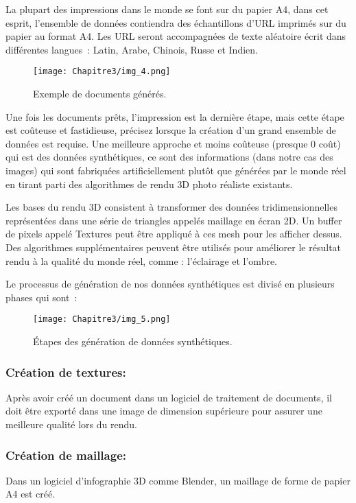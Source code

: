           La plupart des impressions dans le monde se font sur du papier A4, dans cet esprit, l'ensemble de données contiendra des échantillons d'URL imprimés sur du papier au format A4. Les URL seront accompagnées de texte aléatoire écrit dans différentes langues : Latin, Arabe, Chinois, Russe et Indien.
          \begin{figure}[H]
               \centering
               \texttt{[image: Chapitre3/img\_4.png]}
               \caption{Exemple de documents générés.}
               \label{img5}
               \end{figure}

          Une fois les documents prêts, l'impression est la dernière étape, mais cette étape est coûteuse et fastidieuse, précisez lorsque la création d'un grand ensemble de données est requise. Une meilleure approche et moins coûteuse (presque 0 coût) qui est des données synthétiques, ce sont des informations (dans notre cas des images) qui sont fabriquées artificiellement plutôt que générées par le monde réel en tirant parti des algorithmes de rendu 3D photo réaliste existants.

          Les bases du rendu 3D consistent à transformer des données tridimensionnelles représentées dans une série de triangles appelés maillage en écran 2D. Un buffer de pixels appelé Textures peut être appliqué à ces mesh pour les afficher dessus. Des algorithmes supplémentaires peuvent être utilisés pour améliorer le résultat rendu à la qualité du monde réel, comme : l'éclairage et l'ombre.

          Le processus de génération de nos données synthétiques est divisé en plusieurs phases qui sont :
          \begin{figure}[H]
               \centering
               \texttt{[image: Chapitre3/img\_5.png]}
               \caption{Étapes des génération de données synthétiques.}
               \label{img6}
               \end{figure}

          \subsubsection{Création de textures:} Après avoir créé un document dans un logiciel de traitement de documents, il doit être exporté dans une image de dimension supérieure pour 	assurer une meilleure qualité lors du rendu.
          \subsubsection{Création de maillage:} Dans un logiciel d'infographie 3D comme Blender, un maillage de forme de papier A4 est créé.
